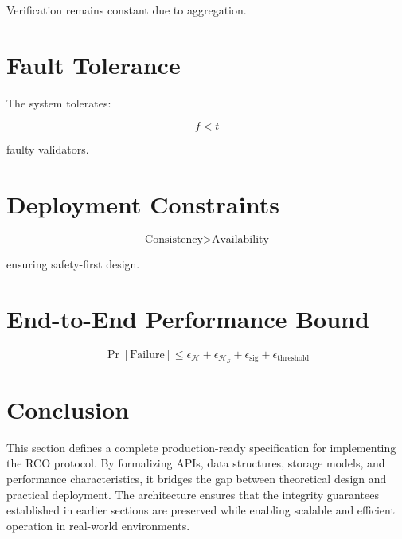 Verification remains constant due to aggregation.

\section{Fault Tolerance}

The system tolerates:

\begin{equation}
f < t
\end{equation}

faulty validators.

\section{Deployment Constraints}

\begin{equation}
\text{Consistency} > \text{Availability}
\end{equation}

ensuring safety-first design.

\section{End-to-End Performance Bound}

\begin{equation}
\Pr[\text{Failure}] \leq \epsilon_{\mathcal{H}} + \epsilon_{\mathcal{H}_S} + \epsilon_{\text{sig}} + \epsilon_{\text{threshold}}
\end{equation}

\section{Conclusion}

This section defines a complete production-ready specification for implementing the RCO protocol. By formalizing APIs, data structures, storage models, and performance characteristics, it bridges the gap between theoretical design and practical deployment. The architecture ensures that the integrity guarantees established in earlier sections are preserved while enabling scalable and efficient operation in real-world environments.